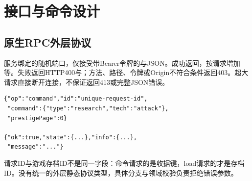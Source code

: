 \chapter{接口与命令设计}
\section{原生RPC外层协议}
服务绑定的随机端口，仅接受带Bearer令牌的与JSON。成功返回，按请求增加等。失败返回HTTP400与；方法、路径、令牌或Origin不符合条件返回403。超大请求直接断开连接，不保证返回413或完整JSON错误。

\begin{lstlisting}
{"op":"command","id":"unique-request-id",
 "command":{"type":"research","tech":"attack"},
 "prestigePage":0}

{"ok":true,"state":{...},"info":{...},
 "message":"..."}
\end{lstlisting}
请求ID与游戏存档ID不是同一字段：命令请求的是收据键，load请求的才是存档ID。没有统一的外层静态协议类型，具体分支与领域校验负责拒绝错误参数。

